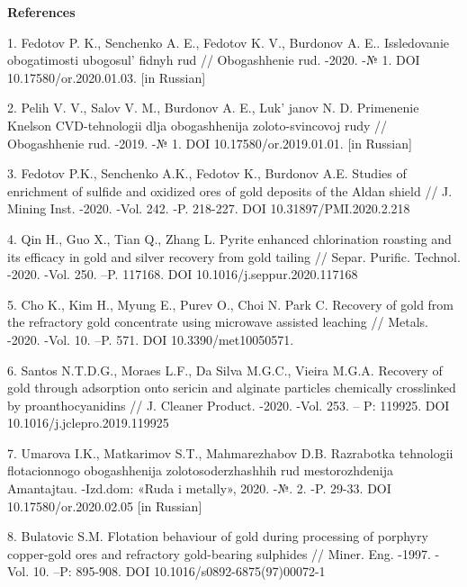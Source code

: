 \begin{center}
{\bfseries References}
\end{center}

\begin{references}

1. Fedotov P. K., Senchenko A. E., Fedotov K. V., Burdonov A. E..
Issledovanie obogatimosti ubogosul' fidnyh rud //
Obogashhenie rud. -2020. -№ 1. DOI 10.17580/or.2020.01.03. {[}in
Russian{]}

2. Pelih V. V., Salov V. M., Burdonov A. E., Luk' janov
N. D. Primenenie Knelson CVD-tehnologii dlja obogashhenija
zoloto-svincovoj rudy // Obogashhenie rud. -2019. -№ 1. DOI
10.17580/or.2019.01.01. {[}in Russian{]}

3. Fedotov P.K., Senchenko A.K., Fedotov K., Burdonov A.E. Studies of
enrichment of sulfide and oxidized ores of gold deposits of the Aldan
shield // J. Mining Inst. -2020. -Vol. 242. -P. 218-227. DOI
10.31897/PMI.2020.2.218

4. Qin H., Guo X., Tian Q., Zhang L. Pyrite enhanced chlorination
roasting and its efficacy in gold and silver recovery from gold tailing
// Separ. Purific. Technol. -2020. -Vol. 250. --P. 117168. DOI
10.1016/j.seppur.2020.117168

5. Cho K., Kim H., Myung E., Purev O., Choi N. Park C. Recovery of gold
from the refractory gold concentrate using microwave assisted leaching
// Metals. -2020. -Vol. 10. --P. 571. DOI 10.3390/met10050571.

6. Santos N.T.D.G., Moraes L.F., Da Silva M.G.C., Vieira M.G.A. Recovery
of gold through adsorption onto sericin and alginate particles
chemically crosslinked by proanthocyanidins // J. Cleaner Product.
-2020. -Vol. 253. -- P: 119925. DOI 10.1016/j.jclepro.2019.119925

7. Umarova I.K., Matkarimov S.T., Mahmarezhabov D.B. Razrabotka
tehnologii flotacionnogo obogashhenija zolotosoderzhashhih rud
mestorozhdenija Amantajtau. -Izd.dom: «Ruda i metally», 2020. -№. 2. -P.
29-33. DOI 10.17580/or.2020.02.05 {[}in Russian{]}

8. Bulatovic S.M. Flotation behaviour of gold during processing of
porphyry copper-gold ores and refractory gold-bearing sulphides //
Miner. Eng. -1997. -Vol. 10. --P: 895-908. DOI
10.1016/s0892-6875(97)00072-1
\end{references}

